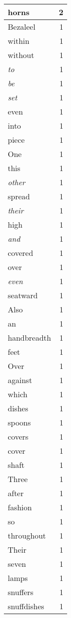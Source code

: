 \begin{center}
\begin{longtable}{l|r}
horns & 2 \\ \hline
Bezaleel & 1 \\ \hline
within & 1 \\ \hline
without & 1 \\ \hline
\emph{to} & 1 \\ \hline
\emph{be} & 1 \\ \hline
\emph{set} & 1 \\ \hline
even & 1 \\ \hline
into & 1 \\ \hline
piece & 1 \\ \hline
One & 1 \\ \hline
this & 1 \\ \hline
\emph{other} & 1 \\ \hline
spread & 1 \\ \hline
\emph{their} & 1 \\ \hline
high & 1 \\ \hline
\emph{and} & 1 \\ \hline
covered & 1 \\ \hline
over & 1 \\ \hline
\emph{even} & 1 \\ \hline
seatward & 1 \\ \hline
Also & 1 \\ \hline
an & 1 \\ \hline
handbreadth & 1 \\ \hline
feet & 1 \\ \hline
Over & 1 \\ \hline
against & 1 \\ \hline
which & 1 \\ \hline
dishes & 1 \\ \hline
spoons & 1 \\ \hline
covers & 1 \\ \hline
cover & 1 \\ \hline
shaft & 1 \\ \hline
Three & 1 \\ \hline
after & 1 \\ \hline
fashion & 1 \\ \hline
so & 1 \\ \hline
throughout & 1 \\ \hline
Their & 1 \\ \hline
seven & 1 \\ \hline
lamps & 1 \\ \hline
snuffers & 1 \\ \hline
snuffdishes & 1 \\ \hline

\end{longtable}
\end{center}
